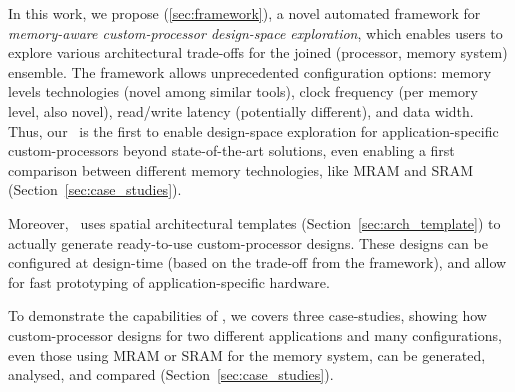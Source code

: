 In this work, we propose \frameworkname (\ref{sec:framework}), a novel automated framework for \textit{memory-aware custom-processor design-space exploration}, which enables users to explore various architectural trade-offs for the joined (processor, memory system) ensemble. The framework allows unprecedented configuration options: memory levels technologies (novel among similar tools), clock frequency (per memory level, also novel), read/write latency (potentially different), and data width. Thus, our \frameworkname~is the first to enable design-space exploration for application-specific custom-processors beyond state-of-the-art solutions, even enabling a first comparison between different memory technologies, like MRAM and SRAM (Section~\ref{sec:case_studies}).

Moreover, \frameworkname~uses spatial architectural templates (Section~\ref{sec:arch_template}) to actually generate ready-to-use custom-processor designs. These designs can be configured at design-time (based on the trade-off from the framework), and allow for fast prototyping of application-specific hardware.

To demonstrate the capabilities of \frameworkname, we covers three case-studies, showing how custom-processor designs for two different applications and many configurations, even those using MRAM or SRAM for the memory system, can be generated, analysed, and compared (Section~\ref{sec:case_studies}).




